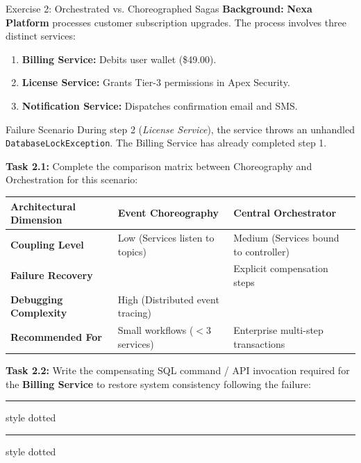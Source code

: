 \documentclass[11pt, a4paper, parskip=half]{scrartcl}
\begin{document}
\begin{exercisebox}[label=ex:saga]{Exercise 2: Orchestrated vs. Choreographed Sagas}
\textbf{Background:} \textbf{Nexa Platform} processes customer subscription upgrades. The process involves three distinct services:
\begin{enumerate}[leftmargin=16pt, itemsep=0pt, label=\textbf{\arabic*.}]
    \item \textbf{Billing Service:} Debits user wallet (\$49.00).
    \item \textbf{License Service:} Grants Tier-3 permissions in Apex Security.
    \item \textbf{Notification Service:} Dispatches confirmation email and SMS.
\end{enumerate}

\vspace{1pt}
\begin{warningbox}{Failure Scenario}
    During step 2 (\textit{License Service}), the service throws an unhandled \texttt{DatabaseLockException}. The Billing Service has already completed step 1.
\end{warningbox}

\vspace{1pt}
\textbf{Task 2.1:} Complete the comparison matrix between Choreography and Orchestration for this scenario:

\vspace{2pt}
\begin{center}
\small
\begin{tabularx}{\textwidth}{X X X}
\toprule
\textbf{Architectural Dimension} & \textbf{Event Choreography} & \textbf{Central Orchestrator} \\
\midrule
\textbf{Coupling Level} & Low (Services listen to topics) & Medium (Services bound to controller) \\
\textbf{Failure Recovery} & \underline{\hspace{4cm}} & Explicit compensation steps \\
\textbf{Debugging Complexity} & High (Distributed event tracing) & \underline{\hspace{4cm}} \\
\textbf{Recommended For} & Small workflows ($<3$ services) & Enterprise multi-step transactions \\
\bottomrule
\end{tabularx}
\end{center}

\vspace{1pt}
\textbf{Task 2.2:} Write the compensating SQL command / API invocation required for the \textbf{Billing Service} to restore system consistency following the failure:
\vspace{10pt}
\hrule style dotted
\vspace{10pt}
\hrule style dotted
\end{exercisebox}
\end{document}
